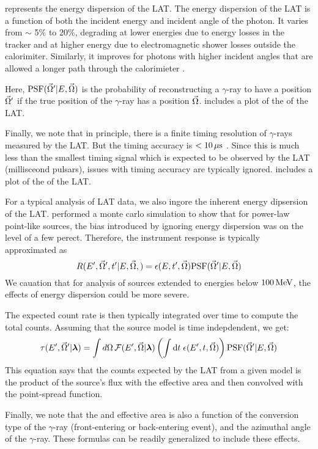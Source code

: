 \edisp represents the energy dispersion of the LAT.  The energy dispersion
of the LAT is a function of both the incident energy and incident angle
of the photon. It varies from $\sim$ 5\% to 20\%, degrading at lower
energies due to energy losses in the tracker and at higher energy due
to electromagnetic shower losses outside the calorimiter. Similarly,
it improves for photons with higher incident angles that are allowed a
longer path through the calorimieter \citep{ackermann_2012a_fermi-large}.

Here, $\text{PSF}(\vec\Omega'|E,\vec\Omega)$ is the probability of
reconstructing a $\gamma$-ray to have a position $\vec\Omega'$ if
the true position of the $\gamma$-ray has a position $\vec\Omega$.
 includes a plot of the \psf of the \ac{LAT}.


Finally, we note that in principle, there is a finite timing resolution
of $\gamma$-rays measured by the \ac{LAT}. But the timing accuracy is
$<10\,\mu\text{s}$ \citep{atwood_2009a_large-telescope}. Since
this is much less than the smallest timing signal which is expected to
be observed by the \ac{LAT} (millisceond pulsars), issues with timing
accuracy are typically ignored.   includes
a plot of the \edisp of the \ac{LAT}.

For a typical analysis of \ac{LAT} data, we also ingore the inherent
energy dipsersion of the \ac{LAT}.  \cite{ackermann_2012a_fermi-large}
performed a monte carlo simulation to show that for power-law point-like
sources, the bias introduced by ignoring energy dispersion was on the
level of a few perect.  
Therefore, the instrument response is typically approximated as
\begin{equation}
  R(E',\vec\Omega',t'|E,\vec\Omega,) = 
  \epsilon(E,t',\vec\Omega) \text{PSF}(\vec\Omega'|E,\vec\Omega)
\end{equation}
We cauation that for analysis of sources extended
to energies below $100\,\text{MeV}$, the effects of energy dispersion
could be more severe.

The expected count rate is then typically integrated over time
to compute the total counts. Assuming that the source model
is time indepdendent, we get: 
\begin{equation}
  \tau(E',\vec\Omega'|\boldsymbol{\lambda})
  = \int d\Omega \,
  \mathcal{F}(E',\vec\Omega|\boldsymbol{\lambda}) 
\left(
\int \text{d}t \; \epsilon(E',t,\vec\Omega) 
\right)
\text{PSF}(\vec\Omega'|E,\vec\Omega)
\end{equation}
This equation says that the counts expected by the LAT
from a given model
is the product of the source's flux with the effective area and then
convolved with the point-spread function.

Finally, we note that the \psf and effective area is also a function of the conversion type
of the $\gamma$-ray (front-entering or back-entering event), and the azimuthal
angle of the $\gamma$-ray. These formulas can be readily generalized to include these effects.
